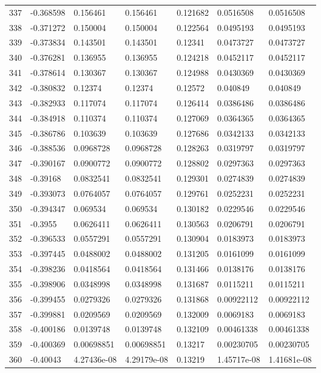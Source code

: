 \begin{longtable}{l|lll|lll}
 337 & -0.368598    & 0.156461    & 0.156461    &  0.121682    & 0.0516508   & 0.0516508   \\
 338 & -0.371272    & 0.150004    & 0.150004    &  0.122564    & 0.0495193   & 0.0495193   \\
 339 & -0.373834    & 0.143501    & 0.143501    &  0.12341     & 0.0473727   & 0.0473727   \\
 340 & -0.376281    & 0.136955    & 0.136955    &  0.124218    & 0.0452117   & 0.0452117   \\
 341 & -0.378614    & 0.130367    & 0.130367    &  0.124988    & 0.0430369   & 0.0430369   \\
 342 & -0.380832    & 0.12374     & 0.12374     &  0.12572     & 0.040849    & 0.040849    \\
 343 & -0.382933    & 0.117074    & 0.117074    &  0.126414    & 0.0386486   & 0.0386486   \\
 344 & -0.384918    & 0.110374    & 0.110374    &  0.127069    & 0.0364365   & 0.0364365   \\
 345 & -0.386786    & 0.103639    & 0.103639    &  0.127686    & 0.0342133   & 0.0342133   \\
 346 & -0.388536    & 0.0968728   & 0.0968728   &  0.128263    & 0.0319797   & 0.0319797   \\
 347 & -0.390167    & 0.0900772   & 0.0900772   &  0.128802    & 0.0297363   & 0.0297363   \\
 348 & -0.39168     & 0.0832541   & 0.0832541   &  0.129301    & 0.0274839   & 0.0274839   \\
 349 & -0.393073    & 0.0764057   & 0.0764057   &  0.129761    & 0.0252231   & 0.0252231   \\
 350 & -0.394347    & 0.069534    & 0.069534    &  0.130182    & 0.0229546   & 0.0229546   \\
 351 & -0.3955      & 0.0626411   & 0.0626411   &  0.130563    & 0.0206791   & 0.0206791   \\
 352 & -0.396533    & 0.0557291   & 0.0557291   &  0.130904    & 0.0183973   & 0.0183973   \\
 353 & -0.397445    & 0.0488002   & 0.0488002   &  0.131205    & 0.0161099   & 0.0161099   \\
 354 & -0.398236    & 0.0418564   & 0.0418564   &  0.131466    & 0.0138176   & 0.0138176   \\
 355 & -0.398906    & 0.0348998   & 0.0348998   &  0.131687    & 0.0115211   & 0.0115211   \\
 356 & -0.399455    & 0.0279326   & 0.0279326   &  0.131868    & 0.00922112  & 0.00922112  \\
 357 & -0.399881    & 0.0209569   & 0.0209569   &  0.132009    & 0.0069183   & 0.0069183   \\
 358 & -0.400186    & 0.0139748   & 0.0139748   &  0.132109    & 0.00461338  & 0.00461338  \\
 359 & -0.400369    & 0.00698851  & 0.00698851  &  0.13217     & 0.00230705  & 0.00230705  \\
 360 & -0.40043     & 4.27436e-08 & 4.29179e-08 &  0.13219     & 1.45717e-08 & 1.41681e-08 \\
\hline
\end{longtable}

